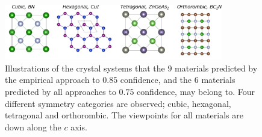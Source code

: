 \documentclass[superscriptaddress,unsortedaddress,
 amsmath,amssymb,
 aps,
]{revtex4-2}
\begin{document}
\begin{figure}[t]
    \centering
    \includegraphics[width=0.85\textwidth]{figures/vesta-images/fig6-all.png}
    \caption{Illustrations of the crystal systems that the $9$ materials predicted by the empirical approach to $0.85$ confidence, and the $6$ materials predicted by all approaches to $0.75$ confidence, may belong to. Four different symmetry categories are observed; cubic, hexagonal, tetragonal and orthorombic. The viewpoints for all materials are down along the $c$ axis.   }
    \label{fig:crystalsystems}
\end{figure}

\end{document}
